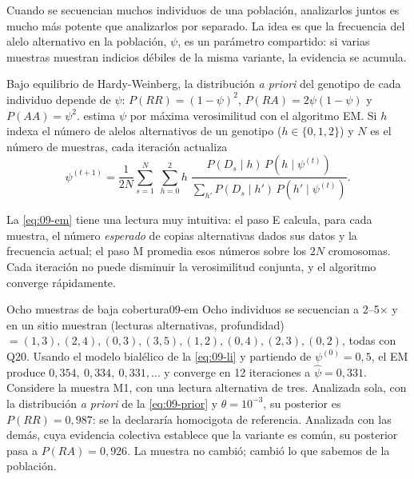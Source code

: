 Cuando se secuencian muchos individuos de una población, analizarlos juntos es mucho más potente que analizarlos por separado. La idea es que la frecuencia del alelo alternativo en la población, $\psi$, es un parámetro compartido: si varias muestras muestran indicios débiles de la misma variante, la evidencia se acumula.

Bajo equilibrio de Hardy-Weinberg, la distribución \emph{a priori} del genotipo de cada individuo depende de $\psi$: $P(RR)=(1-\psi)^2$, $P(RA)=2\psi(1-\psi)$ y $P(AA)=\psi^2$. \textcite{c09-li2011stat} estima $\psi$ por máxima verosimilitud con el algoritmo EM. Si $h$ indexa el número de alelos alternativos de un genotipo ($h\in\{0,1,2\}$) y $N$ es el número de muestras, cada iteración actualiza
\begin{equation}\label{eq:09-em}
\psi^{(t+1)} = \frac{1}{2N}\sum_{s=1}^{N}\ \sum_{h=0}^{2} h\;
\frac{P(D_s\mid h)\,P(h\mid\psi^{(t)})}{\sum_{h'}P(D_s\mid h')\,P(h'\mid\psi^{(t)})}.
\end{equation}

\begin{simbolos}
\end{simbolos}

La \cref{eq:09-em} tiene una lectura muy intuitiva: el paso E calcula, para cada muestra, el número \emph{esperado} de copias alternativas dados sus datos y la frecuencia actual; el paso M promedia esos números sobre los $2N$ cromosomas. Cada iteración no puede disminuir la verosimilitud conjunta, y el algoritmo converge rápidamente.

\begin{ejemplo}{Ocho muestras de baja cobertura}{09-em}
Ocho individuos se secuencian a 2--5$\times$ y en un sitio muestran (lecturas alternativas, profundidad) $=(1,3),(2,4),(0,3),(3,5),(1,2),(0,4),(2,3),(0,2)$, todas con Q20. Usando el modelo bialélico de la \cref{eq:09-li} y partiendo de $\psi^{(0)}=0{,}5$, el EM produce $0{,}354,\ 0{,}334,\ 0{,}331,\dots$ y converge en 12 iteraciones a $\hat\psi=0{,}331$. Considere la muestra M1, con una lectura alternativa de tres. Analizada sola, con la distribución \emph{a priori} de la \cref{eq:09-prior} y $\theta=10^{-3}$, su posterior es $P(RR)=0{,}987$: se la declararía homocigota de referencia. Analizada con las demás, cuya evidencia colectiva establece que la variante es común, su posterior pasa a $P(RA)=0{,}926$. La muestra no cambió; cambió lo que sabemos de la población.
\end{ejemplo}

